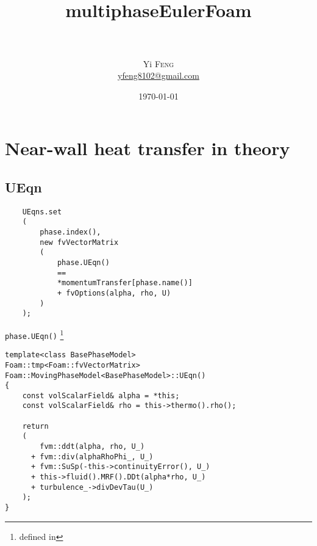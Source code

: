 \documentclass{article}
\title{
        \horrule{2pt} \\[0.5cm] %
        \Huge{multiphaseEulerFoam}\\
        \horrule{2pt} \\[0.5cm] %
        } %
\author{
        \Large{Yi \textsc{Feng}}\\
        \href{mailto:yfeng8102@gmail.com}{yfeng8102@gmail.com}
        } %
\date{\today} %
\begin{document}
\maketitle %
\thispagestyle{empty}

\cleardoublepage
{}
\tableofcontents %


\cleardoublepage
{}

\section{Near-wall heat transfer in theory}

\subsection{UEqn}

\begin{verbatim}
    UEqns.set
    (
        phase.index(),
        new fvVectorMatrix
        (
            phase.UEqn()
            ==
            *momentumTransfer[phase.name()]
            + fvOptions(alpha, rho, U)
        )
    );    
\end{verbatim}

\texttt{phase.UEqn()} \footnote{ defined in }

\begin{verbatim}
template<class BasePhaseModel>
Foam::tmp<Foam::fvVectorMatrix>
Foam::MovingPhaseModel<BasePhaseModel>::UEqn()
{
    const volScalarField& alpha = *this;
    const volScalarField& rho = this->thermo().rho();

    return
    (
        fvm::ddt(alpha, rho, U_)
      + fvm::div(alphaRhoPhi_, U_)
      + fvm::SuSp(-this->continuityError(), U_)
      + this->fluid().MRF().DDt(alpha*rho, U_)
      + turbulence_->divDevTau(U_)
    );
}   
\end{verbatim}
\end{document}
